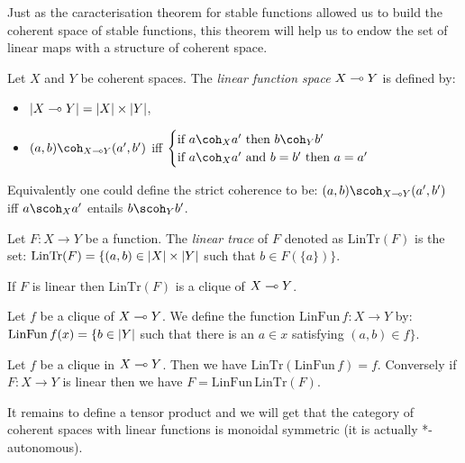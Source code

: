 Just as the caracterisation theorem for stable functions allowed us to
build the coherent space of stable functions, this theorem will help us
to endow the set of linear maps with a structure of coherent space.

\begin{definition}
Let $X$ and $Y$ be coherent spaces. The \emph{linear function space} $X\multimap Y$ is defined by:
\begin{itemize}
\item $\left|X\multimap Y\right| = \left|X\right|\times \left|Y\right|$,
\item $(a,b)\coh_{X\limp Y}(a', b')$ iff $\begin{cases}\text{if }a\coh_X a'\text{ then } b\coh_Y b'\\
 \text{if }a\coh_X a' \text{ and }b=b'\text{ then }a=a'\end{cases}$
\end{itemize}
\end{definition}

Equivalently one could define the strict coherence to be:
\((a,b)\scoh_{X\limp Y}(a',b')\) iff \(a\scoh_X a'\) entails \(b\scoh_Y b'\).

\begin{definition}
Let $F:X\longrightarrow Y$ be a function. The \emph{linear trace} of $F$ denoted as $\mathrm{LinTr}(F)$ is the set:
  $\mathrm{LinTr}(F) = \{(a, b)\in\left|X\right|\times\left|Y\right|$ such that $b\in F(\{a\})\}$.
\end{definition}

\begin{theorem}
If $F$ is linear then $\mathrm{LinTr}(F)$ is a clique of $X\multimap Y$.
\end{theorem}

\begin{definition}
Let $f$ be a clique of $X\multimap Y$. We define the function $\mathrm{LinFun}\,f:X\longrightarrow Y$ by: $\mathrm{LinFun}\,f(x) = \{b\in\left|Y\right|$ such that there is an $a\in x$ satisfying $(a,b)\in f\}$.
\end{definition}

\begin{theorem}
Let $f$ be a clique in $X\multimap Y$. Then we have $\mathrm{LinTr}(\mathrm{LinFun}\, f) = f$. Conversely if $F:X\longrightarrow Y$ is linear then we have $F = \mathrm{LinFun}\,\mathrm{LinTr}(F)$.
\end{theorem}

It remains to define a tensor product and we will get that the category
of coherent spaces with linear functions is monoidal symmetric (it is
actually *-autonomous).


